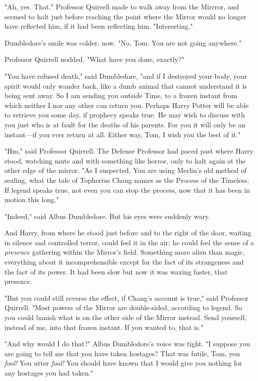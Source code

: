 "Ah, yes. That." Professor Quirrell made to walk away from the Mirrror, and
seemed to halt just before reaching the point where the Mirror would no longer
have reflected him, if it had been reflecting him. "Interesting."

Dumbledore's smile was colder, now. "No, Tom. You are not going anywhere."

Professor Quirrell nodded. "What have you done, exactly?"

"You have refused death," said Dumbledore, "and if I destroyed your body, your
spirit would only wander back, like a dumb animal that cannot understand it is
being sent away. So I am sending you outside Time, to a frozen instant from
which neither I nor any other can return you. Perhaps Harry Potter will be able
to retrieve you some day, if prophecy speaks true. He may wish to discuss with
you just who is at fault for the deaths of his parents. For you it will only be
an instant---if you ever return at all. Either way, Tom, I wish you the best of
it."

"Hm," said Professor Quirrell. The Defense Professor had paced past where Harry
stood, watching mute and with something like horror, only to halt again at the
other edge of the mirror. "As I suspected. You are using Merlin's old method of
sealing, what the tale of Topherius Chang names as the Process of the Timeless.
If legend speaks true, not even you can stop the process, now that it has been
in motion this long."

"Indeed," said Albus Dumbledore. But his eyes were suddenly wary.

And Harry, from where he stood just before and to the right of the door,
waiting in silence and controlled terror, could feel it in the air; he could
feel the sense of a \emph{presence} gathering within the Mirror's field.
Something more alien than magic, everything about it incomprehensible except
for the fact of its strangeness and the fact of its power. It had been slow but
now it was waxing faster, that presence.

"But you could still reverse the effect, if Chang's account is true," said
Professor Quirrell. "Most powers of the Mirror are double-sided, according to
legend. So you could banish what is on the other side of the Mirror instead.
Send yourself, instead of me, into that frozen instant. If you wanted to, that
is."

"And why would I do that?" Albus Dumbledore's voice was tight. "I suppose you
are going to tell me that you have taken hostages? That was futile, Tom, you
\emph{fool!} You utter \emph{fool!} You should have known that I would give you
nothing for any hostages you had taken."

